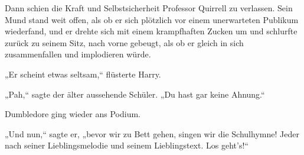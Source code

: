 Dann schien die Kraft und Selbstsicherheit Professor Quirrell zu verlassen. Sein Mund stand weit offen, als ob er sich plötzlich vor einem unerwarteten Publikum wiederfand, und er drehte sich mit einem krampfhaften Zucken um und schlurfte zurück zu seinem Sitz, nach vorne gebeugt, als ob er gleich in sich zusammenfallen und implodieren würde.

„Er scheint etwas seltsam,“ flüsterte Harry.

„Pah,“ sagte der älter aussehende Schüler. „Du hast gar keine Ahnung.“

Dumbledore ging wieder ans Podium.

„Und nun,“ sagte er, „bevor wir zu Bett gehen, singen wir die Schulhymne! Jeder nach seiner Lieblingsmelodie und seinem Lieblingstext. Los geht’s!“

